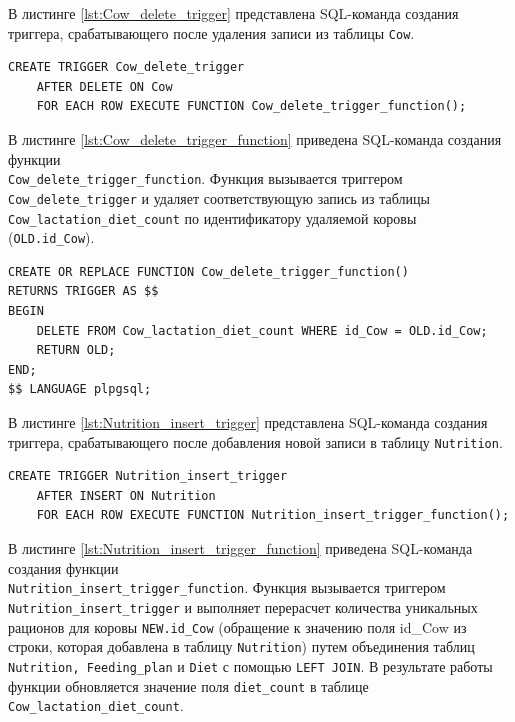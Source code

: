 В листинге \ref{lst:Cow_delete_trigger} представлена SQL-команда создания триггера,
срабатывающего после удаления записи из таблицы \texttt{Cow}.

\begin{lstlisting}[caption={Создание триггера Cow\_delete\_trigger}, label={lst:Cow_delete_trigger}]
CREATE TRIGGER Cow_delete_trigger 
    AFTER DELETE ON Cow 
    FOR EACH ROW EXECUTE FUNCTION Cow_delete_trigger_function();
\end{lstlisting}

В листинге \ref{lst:Cow_delete_trigger_function} приведена SQL-команда создания функции \\
\texttt{Cow\_delete\_trigger\_function}.
Функция вызывается триггером \\\texttt{Cow\_delete\_trigger}
и удаляет соответствующую запись из таблицы \texttt{Cow\_lactation\_diet\_count}
по идентификатору удаляемой коровы \\(\texttt{OLD.id\_Cow}).

\begin{lstlisting}[caption={Создание функции Cow\_delete\_trigger\_function}, label={lst:Cow_delete_trigger_function}]
CREATE OR REPLACE FUNCTION Cow_delete_trigger_function()
RETURNS TRIGGER AS $$
BEGIN
    DELETE FROM Cow_lactation_diet_count WHERE id_Cow = OLD.id_Cow;
    RETURN OLD;
END;
$$ LANGUAGE plpgsql;
\end{lstlisting}

В листинге \ref{lst:Nutrition_insert_trigger} представлена SQL-команда создания триггера,
срабатывающего после добавления новой записи в таблицу \texttt{Nutrition}.

\begin{lstlisting}[caption={Создание триггера Nutrition\_insert\_trigger}, label={lst:Nutrition_insert_trigger}]
CREATE TRIGGER Nutrition_insert_trigger
    AFTER INSERT ON Nutrition 
    FOR EACH ROW EXECUTE FUNCTION Nutrition_insert_trigger_function();
\end{lstlisting}

В листинге \ref{lst:Nutrition_insert_trigger_function} приведена SQL-команда создания функции \\
\texttt{Nutrition\_insert\_trigger\_function}.
Функция вызывается триггером \texttt{Nutrition\_insert\_trigger} и выполняет перерасчет количества
уникальных рационов для коровы \texttt{NEW.id\_Cow} (обращение к значению поля id\_Cow из строки,
которая добавлена в таблицу \texttt{Nutrition}) путем объединения таблиц
\texttt{Nutrition, Feeding\_plan} и \texttt{Diet} с помощью \texttt{LEFT JOIN}.
В результате работы функции обновляется значение поля
\texttt{diet\_count} в таблице \texttt{Cow\_lactation\_diet\_count}.

